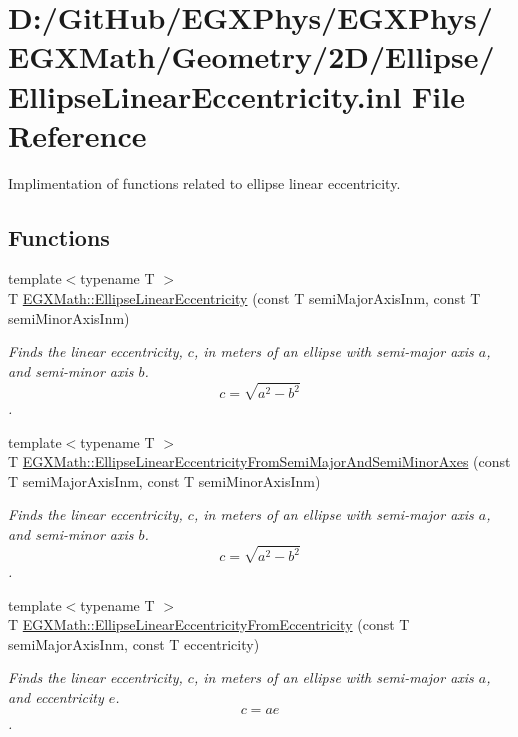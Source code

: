 \hypertarget{_ellipse_linear_eccentricity_8inl}{}\section{D\+:/\+Git\+Hub/\+E\+G\+X\+Phys/\+E\+G\+X\+Phys/\+E\+G\+X\+Math/\+Geometry/2\+D/\+Ellipse/\+Ellipse\+Linear\+Eccentricity.inl File Reference}
\label{_ellipse_linear_eccentricity_8inl}


Implimentation of functions related to ellipse linear eccentricity.  


\subsection*{Functions}
\begin{DoxyCompactItemize}
\item 
{\footnotesize template$<$typename T $>$ }\\T \mbox{\hyperlink{group___e_g_x_math-_geometry-2_d-_ellipse-_linear_eccentricity_gac70b3010e30aa8b73deb50fe2b9b9a91}{E\+G\+X\+Math\+::\+Ellipse\+Linear\+Eccentricity}} (const T semi\+Major\+Axis\+Inm, const T semi\+Minor\+Axis\+Inm)
\begin{DoxyCompactList}\small\item\em Finds the linear eccentricity, $c$, in meters of an ellipse with semi-\/major axis $a$, and semi-\/minor axis $b$. \[ c=\sqrt{a^2-b^2} \]. \end{DoxyCompactList}\item 
{\footnotesize template$<$typename T $>$ }\\T \mbox{\hyperlink{group___e_g_x_math-_geometry-2_d-_ellipse-_linear_eccentricity_gaa5eb80a161cf3597ea6971f4a1d2f8e8}{E\+G\+X\+Math\+::\+Ellipse\+Linear\+Eccentricity\+From\+Semi\+Major\+And\+Semi\+Minor\+Axes}} (const T semi\+Major\+Axis\+Inm, const T semi\+Minor\+Axis\+Inm)
\begin{DoxyCompactList}\small\item\em Finds the linear eccentricity, $c$, in meters of an ellipse with semi-\/major axis $a$, and semi-\/minor axis $b$. \[ c=\sqrt{a^2-b^2} \]. \end{DoxyCompactList}\item 
{\footnotesize template$<$typename T $>$ }\\T \mbox{\hyperlink{group___e_g_x_math-_geometry-2_d-_ellipse-_linear_eccentricity_gad768e5a198895dd2646b190b7d3208de}{E\+G\+X\+Math\+::\+Ellipse\+Linear\+Eccentricity\+From\+Eccentricity}} (const T semi\+Major\+Axis\+Inm, const T eccentricity)
\begin{DoxyCompactList}\small\item\em Finds the linear eccentricity, $c$, in meters of an ellipse with semi-\/major axis $a$, and eccentricity $e$. \[ c=a e \]. \end{DoxyCompactList}\end{DoxyCompactItemize}


